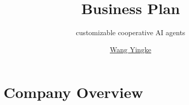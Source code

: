 \documentclass{beamer}
\title{Business Plan}
\subtitle{customizable cooperative AI agents}
\author{\href{s332758@studenti.polito.it}{Wang Yingke}}
\newcommand{\hrefcol}[2]{\textcolor{cyan}{\href{#1}{#2}}}
\begin{document}
\maketitle

%
%
%
%



\section{Company Overview}

\end{document}
